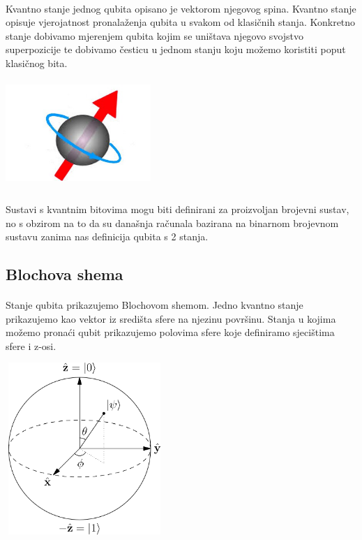 \documentclass[times, utf8, zavrsni, numeric]{fer}
\begin{document}
\paragraph{}
Kvantno stanje jednog qubita opisano je vektorom njegovog spina. Kvantno stanje opisuje vjerojatnost pronalaženja qubita u svakom od klasičnih stanja. Konkretno stanje dobivamo mjerenjem qubita kojim se uništava njegovo svojstvo superpozicije te dobivamo česticu u jednom stanju koju možemo koristiti poput klasičnog bita.

\begin{center}
\includegraphics[width=55mm, height=40mm]{spin}
\end{center}

\paragraph{}
Sustavi s kvantnim bitovima mogu biti definirani za proizvoljan brojevni sustav, no s obzirom na to da su današnja računala bazirana na binarnom brojevnom sustavu zanima nas definicija qubita s 2 stanja.

\subsection{Blochova shema}
\paragraph{}
Stanje qubita prikazujemo Blochovom shemom. Jedno kvantno stanje prikazujemo kao vektor iz središta sfere na njezinu površinu. Stanja u kojima možemo pronaći qubit prikazujemo polovima sfere koje definiramo sjecištima sfere i z-osi. \citep{computer_scientist} \citep{qubit_geometry}

\begin{center}
\includegraphics[width=60mm, height=65mm]{bloch}
\end{center}
\end{document}

